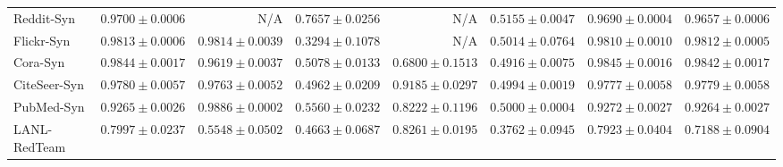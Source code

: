 \documentclass[applsci,article,submit,moreauthors,pdftex]{Definitions/mdpi}
\begin{document}
\begin{table}[H]
\begin{tabular*}{\textwidth}{@{\extracolsep{\fill}}lrrrrrrr}
Reddit-Syn & $\mathbf{0.9700 \pm 0.0006}$ & N/A & $0.7657 \pm 0.0256$ & N/A & $0.5155 \pm 0.0047$ & $0.9690 \pm 0.0004$ & $0.9657 \pm 0.0006$ \\
Flickr-Syn & $0.9813 \pm 0.0006$ & $\mathbf{0.9814 \pm 0.0039}$ & $0.3294 \pm 0.1078$ & N/A & $0.5014 \pm 0.0764$ & $0.9810 \pm 0.0010$ & $0.9812 \pm 0.0005$ \\
Cora-Syn & $0.9844 \pm 0.0017$ & $0.9619 \pm 0.0037$ & $0.5078 \pm 0.0133$ & $0.6800 \pm 0.1513$ & $0.4916 \pm 0.0075$ & $\mathbf{0.9845 \pm 0.0016}$ & $0.9842 \pm 0.0017$ \\
CiteSeer-Syn & $\mathbf{0.9780 \pm 0.0057}$ & $0.9763 \pm 0.0052$ & $0.4962 \pm 0.0209$ & $0.9185 \pm 0.0297$ & $0.4994 \pm 0.0019$ & $0.9777 \pm 0.0058$ & $0.9779 \pm 0.0058$ \\
PubMed-Syn & $0.9265 \pm 0.0026$ & $\mathbf{0.9886 \pm 0.0002}$ & $0.5560 \pm 0.0232$ & $0.8222 \pm 0.1196$ & $0.5000 \pm 0.0004$ & $0.9272 \pm 0.0027$ & $0.9264 \pm 0.0027$ \\\midrule
LANL-RedTeam & $0.7997 \pm 0.0237$ & $0.5548 \pm 0.0502$ & $0.4663 \pm 0.0687$ & $\mathbf{0.8261 \pm 0.0195}$ & $0.3762 \pm 0.0945$ & $0.7923 \pm 0.0404$ & $0.7188 \pm 0.0904$ \\\bottomrule
\end{tabular*}
\end{table}
\end{document}
